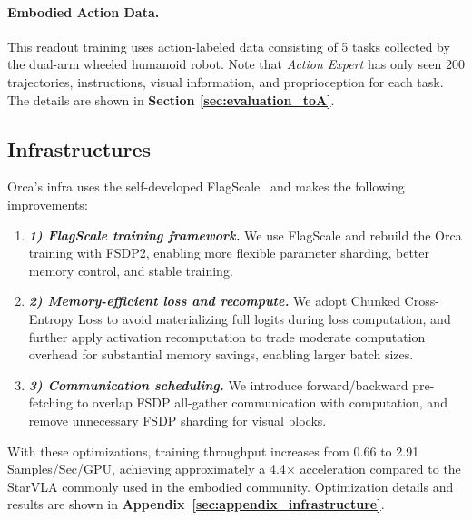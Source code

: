 \paragraph{Embodied Action Data.} 
This readout training uses action-labeled data consisting of 5 tasks collected by the dual-arm wheeled humanoid robot. Note that \textit{Action Expert} has only seen 200 trajectories, instructions, visual information, and proprioception for each task. The details are shown in \textbf{Section \ref{sec:evaluation_toA}}.



\subsection{Infrastructures}
\label{sec:pretraining_infrastructures}

Orca's infra uses the self-developed FlagScale~\citep{flagscale} and makes the following improvements:


\vspace{-1ex}
\begin{enumerate}[
    leftmargin=1.35em,
    itemsep=0.35em,
    topsep=0.35em,
    parsep=0em
]
    \item[] \textbf{\textit{1) FlagScale training framework.}} 
    We use FlagScale and rebuild the Orca training with FSDP2, enabling more flexible parameter sharding, better memory control, and stable training.
    
    \item[] \textbf{\textit{2) Memory-efficient loss and recompute.}}
    We adopt Chunked Cross-Entropy Loss to avoid materializing full logits during loss computation, and further apply activation recomputation to trade moderate computation overhead for substantial memory savings, enabling larger batch sizes.
    
    \item[] \textbf{\textit{3) Communication scheduling.}}
    We introduce forward/backward pre-fetching to overlap FSDP all-gather communication with computation, and remove unnecessary FSDP sharding for visual blocks.
\end{enumerate}


With these optimizations, training throughput increases from 0.66 to 2.91 Samples/Sec/GPU, achieving approximately a 4.4$\times$ acceleration compared to the StarVLA \citep{StarVLA} commonly used in the embodied community. Optimization details and results are shown in \textbf{Appendix~\ref{sec:appendix_infrastructure}}.